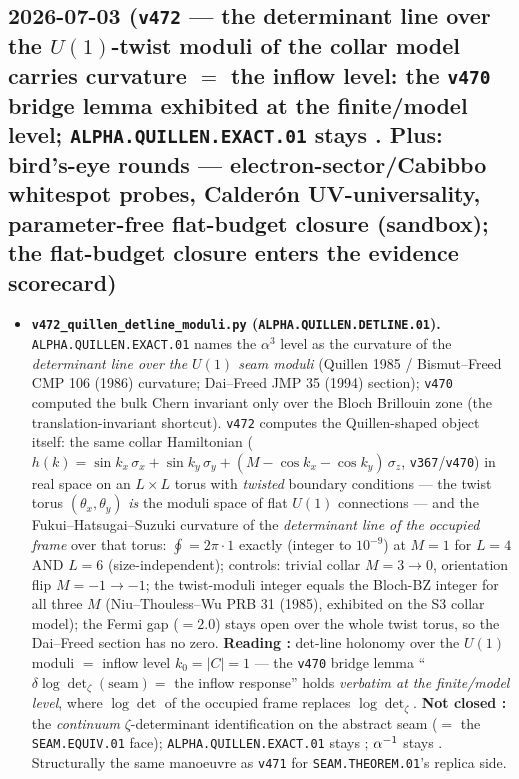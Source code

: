 \subsection*{2026-07-03 (\texttt{v472} --- the determinant line over the $U(1)$-twist moduli of the collar model carries curvature $=$ the inflow level: the \texttt{v470} bridge lemma exhibited at the finite/model level; \texttt{ALPHA.QUILLEN.EXACT.01} stays \mO. Plus: bird's-eye rounds --- electron-sector/Cabibbo whitespot probes, Calder\'on UV-universality, parameter-free flat-budget closure (sandbox); the flat-budget closure enters the evidence scorecard)}
\begin{itemize}[leftmargin=1.5em]
\item \textbf{\texttt{v472\_quillen\_detline\_moduli.py} (\texttt{ALPHA.QUILLEN.DETLINE.01}).}
\texttt{ALPHA.QUILLEN.EXACT.01} names the $\alpha^3$ level as the curvature of the \emph{determinant line
over the $U(1)$ seam moduli} (Quillen 1985 / Bismut--Freed CMP 106 (1986) curvature; Dai--Freed JMP 35
(1994) section); \texttt{v470} computed the bulk Chern invariant only over the Bloch Brillouin zone (the
translation-invariant shortcut). \texttt{v472} computes the Quillen-shaped object itself: the same collar
Hamiltonian ($h(k)=\sin k_x\,\sigma_x+\sin k_y\,\sigma_y+(M-\cos k_x-\cos k_y)\,\sigma_z$,
\texttt{v367}/\texttt{v470}) in real space on an $L\times L$ torus with \emph{twisted} boundary conditions --- the twist
torus $(\theta_x,\theta_y)$ \emph{is} the moduli space of flat $U(1)$ connections --- and the
Fukui--Hatsugai--Suzuki curvature of the \emph{determinant line of the occupied frame} over that torus:
$\oint = 2\pi\cdot 1$ exactly (integer to $10^{-9}$) at $M{=}1$ for $L{=}4$ AND $L{=}6$ (size-independent);
controls: trivial collar $M{=}3\to 0$, orientation flip $M{=}{-}1\to-1$; the twist-moduli integer equals
the Bloch-BZ integer for all three $M$ (Niu--Thouless--Wu PRB 31 (1985), exhibited on the S3 collar model);
the Fermi gap ($=2.0$) stays open over the whole twist torus, so the Dai--Freed section has no zero.
\textbf{Reading \mC:} det-line holonomy over the $U(1)$ moduli $=$ inflow level $k_0=|C|=1$ --- the
\texttt{v470} bridge lemma ``$\delta\log\det_\zeta(\mathrm{seam})=$ the inflow response'' holds
\emph{verbatim at the finite/model level}, where $\log\det$ of the occupied frame replaces
$\log\det_\zeta$. \textbf{Not closed \mO:} the \emph{continuum} $\zeta$-determinant identification on the
abstract seam ($=$ the \texttt{SEAM.EQUIV.01} face); \texttt{ALPHA.QUILLEN.EXACT.01} stays \mO; $\alpha^{-1}$
stays \mE. Structurally the same manoeuvre as \texttt{v471} for \texttt{SEAM.THEOREM.01}'s replica side.

\end{itemize}
